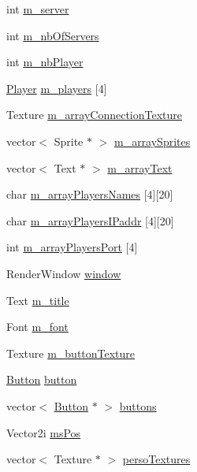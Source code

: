 \begin{DoxyCompactItemize}
\item 
int \hyperlink{class_game_a7d466d7035c178e0bda6213097a5494e}{m\+\_\+server}
\item 
int \hyperlink{class_game_a8ece0b988b3b61990806f15c85a696cd}{m\+\_\+nb\+Of\+Servers}
\item 
int \hyperlink{class_game_aa5ecceb630ef75f3a2098c14aa32bdf6}{m\+\_\+nb\+Player}
\item 
\hyperlink{gamelib_8hpp_af30e2030635a69690f85e48bc6ef202f}{Player} \hyperlink{class_game_a38d250490b02207c472dabff033b2698}{m\+\_\+players} \mbox{[}4\mbox{]}
\item 
Texture \hyperlink{class_game_a1598f69be155189c3bb11085f1c09941}{m\+\_\+array\+Connection\+Texture}
\item 
vector$<$ Sprite $\ast$ $>$ \hyperlink{class_game_abf146b48291f9181101f3e9f64fc79fd}{m\+\_\+array\+Sprites}
\item 
vector$<$ Text $\ast$ $>$ \hyperlink{class_game_af0962fd29c65da3b252af011b97112c7}{m\+\_\+array\+Text}
\item 
char \hyperlink{class_game_aaad584aa5af55ff622aed20b100e84b6}{m\+\_\+array\+Players\+Names} \mbox{[}4\mbox{]}\mbox{[}20\mbox{]}
\item 
char \hyperlink{class_game_a07b6b5690df46f10f6162af2d0448a82}{m\+\_\+array\+Players\+I\+Paddr} \mbox{[}4\mbox{]}\mbox{[}20\mbox{]}
\item 
int \hyperlink{class_game_a5725f31c673785a45c5a6c37433ba253}{m\+\_\+array\+Players\+Port} \mbox{[}4\mbox{]}
\item 
Render\+Window \hyperlink{class_game_a8773f0f2562575ce000b0a6abb6c87ed}{window}
\item 
Text \hyperlink{class_game_ac6f5762c0f546512838893970fd9436e}{m\+\_\+title}
\item 
Font \hyperlink{class_game_a2141a4a7b82e11a9c4f4dd1ec62bb0eb}{m\+\_\+font}
\item 
Texture \hyperlink{class_game_acd7b0bcfc0ef3d114455432d2fe8e137}{m\+\_\+button\+Texture}
\item 
\hyperlink{class_button}{Button} \hyperlink{class_game_a16e92942e7362adb169b98e56e59aa0e}{button}
\item 
vector$<$ \hyperlink{class_button}{Button} $\ast$ $>$ \hyperlink{class_game_ae699e93a493eb14c7009054c5ddab8d7}{buttons}
\item 
Vector2i \hyperlink{class_game_a5caae82a187e433175a08de88a17b4db}{ms\+Pos}
\item 
vector$<$ Texture $\ast$ $>$ \hyperlink{class_game_a9ce381e463f20cfa4b02e7883a911562}{perso\+Textures}

\end{DoxyCompactItemize}
